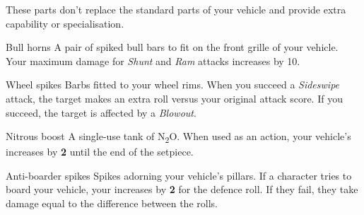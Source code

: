 
These parts don't replace the standard parts of your vehicle and provide extra capability or specialisation.

\begin{describe}{Bull horns}
  A pair of spiked bull bars to fit on the front grille of your vehicle. Your maximum damage for \emph{Shunt} and \emph{Ram} attacks increases by 10.
\end{describe}

\begin{describe}{Wheel spikes}
  Barbs fitted to your wheel rims. When you succeed a \emph{Sideswipe} attack, the target makes an extra  roll versus your original attack score. If you succeed, the target is affected by a \emph{Blowout}.
\end{describe}

\begin{describe}{Nitrous boost}
  A single-use tank of N\textsubscript{2}O. When used as an action, your vehicle's  increases by \textbf{2} until the end of the setpiece.
\end{describe}

\begin{describe}{Anti-boarder spikes}
  Spikes adorning your vehicle's pillars. If a character tries to board your vehicle, your  increases by \textbf{2} for the defence roll. If they fail, they take damage equal to the difference between the rolls.
\end{describe}

